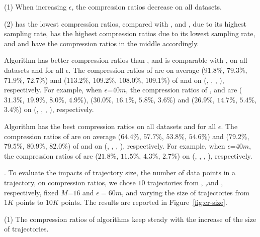 \ni (1) When increasing $\epsilon$, the compression ratios decrease on all datasets.

\ni (2) \pricar has the lowest compression ratios, compared with \truck, \sercar and \geolife, due to its highest sampling rate,
\truck has the highest compression ratios due to its lowest sampling rate, and \sercar and \geolife have the compression ratios in the middle accordingly.

 Algorithm \cist has better compression ratios than \squishe, and is {comparable} with \dps, on all datasets and for all $\epsilon$.
%
The compression ratios of \cist are on average ($91.8\%$, $79.3\%$, $71.9\%$, {$72.7\%$}) and ($113.2\%$, $109.2\%$, $108.0\%$, $109.1\%$) of \squishe and \dps on (\truck, \sercar, \geolife, \pricar), respectively.
%
For example, when $\epsilon$=$40m$, the compression ratios of \squishe, \cist and \dps are ($31.3\%$, $19.9\%$, $8.0\%$, $4.9\%$), ($30.0\%$, $16.1\%$, $5.8\%$, $3.6\%$) and ($26.9\%$, $14.7\%$, $5.4\%$, $3.4\%$) on (\truck, \sercar, \geolife, \pricar), respectively.

 Algorithm \cista has {the best} compression ratios on all datasets and for all $\epsilon$.
%
The compression ratios of \cista are on average ($64.4\%$, $57.7\%$, $53.8\%$, {$54.6\%$}) and ($79.2\%$, $79.5\%$, $80.9\%$, $82.0\%$) of \squishe and \dps on (\truck, \sercar, \geolife, \pricar), respectively.
%
For example, when $\epsilon$=$40m$, the compression ratios of \cista are ($21.8\%$, $11.5\%$, $4.3\%$, $2.7\%$) on (\truck, \sercar, \geolife, \pricar), respectively.



.
To evaluate the impacts of trajectory size, \ie the number of data points in a trajectory, on compression ratios,
we chose {$10$} trajectories from \truck, \sercar,\geolife and \pricar, respectively,
fixed {$M$=$16$} and $\epsilon = 60m$, and varying the size  of trajectories from $1K$ points to $10K$ points.
%
The results are reported in Figure~\ref{fig:cr-size}.

\ni(1) The compression ratios of \lsa algorithms keep steady with the increase of the size of trajectories.






